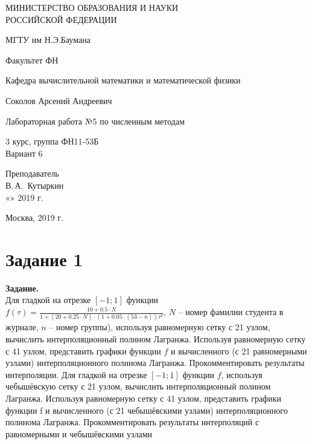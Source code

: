\documentclass[14pt,a4paper]{scrartcl}
\begin{document}
	\begin{titlepage}
	\begin{center}
		\large
		МИНИСТЕРСТВО ОБРАЗОВАНИЯ И НАУКИ\\ РОССИЙСКОЙ ФЕДЕРАЦИИ
		
		\vspace{0.5cm}
		
		МГТУ им Н.Э.Баумана
		\vspace{0.25cm}
		
		Факультет ФН
		
		Кафедра вычислительной математики и математической физики
		\vfill
		
		
		Соколов Арсений Андреевич\\
		\vfill
		
		
		{\LARGE Лабораторная работа №5 по численным методам\\[2mm]
		}
		\bigskip
		
		3 курс, группа ФН11-53Б\\
		Вариант 6
	\end{center}
	\vfill
	
	\newlength{\ML}
	\hfill\begin{minipage}{0.4\textwidth}
		Преподаватель\\
		\underline{\hspace{3cm}} В.\,А.~Кутыркин\\
		«\underline{\hspace{0.7cm}}» \underline{\hspace{1.71cm}} 2019 г.
	\end{minipage}%
	\bigskip
	
	
	\vfill
	
	\begin{center}
		Москва, 2019 г.
	\end{center}
\end{titlepage}

\section*{Задание 1}
\textbf{Задание.}\\
Для гладкой на отрезке $[-1;1]$ функции $f(\tau) = \frac{10+0.5 \cdot N}{1+(20+0.25\cdot N)\cdot(1+0.05\cdot(53-n))\tau^2}$, $N$ -- номер фамилии студента в журнале, $n$ -- номер группы), используя равномерную сетку с 21 узлом, вычислить интерполяционный полином Лагранжа. Используя равномерную сетку с 41 узлом, представить графики функции $f$ и вычисленного (с 21 равномерными узлами) интерполяционного полинома Лагранжа. Прокомментировать результаты интерполяции.
Для гладкой на отрезке $[-1;1]$ функции $f$, используя чебышёвскую сетку с 21 узлом, вычислить интерполяционный полином Лагранжа. Используя равномерную сетку с 41 узлом, представить графики функции f и вычисленного (с 21 чебышёвскими узлами) интерполяционного полинома Лагранжа.
Прокомментировать результаты интерполяций с равномерными и чебышёвскими
узлами
\end{document}
